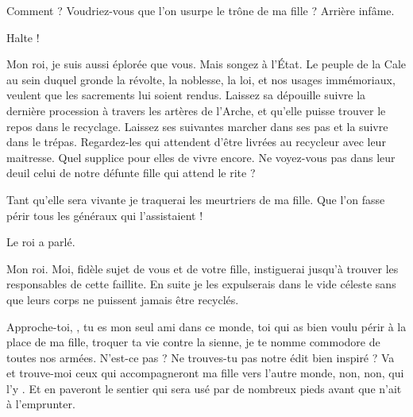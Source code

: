\begin{drama}
  \roispeaks Comment ? Voudriez-vous que l’on usurpe le trône de ma fille ? Arrière infâme.

  \kingsgardsspeaks {} Halte !

  \reinespeaks Mon roi, je suis aussi éplorée que vous. Mais songez à l’État. Le peuple de la Cale au sein duquel gronde la révolte, la noblesse, la loi, et nos usages immémoriaux, veulent que les sacrements lui soient rendus. Laissez sa dépouille suivre la dernière procession à travers les artères de l’Arche, et qu’elle puisse trouver le repos dans le recyclage. Laissez ses suivantes marcher dans ses pas et la suivre dans le trépas.
  Regardez-les qui attendent d’être livrées au recycleur avec leur maitresse. Quel supplice pour elles de vivre encore. Ne voyez-vous pas dans leur deuil celui de notre défunte fille qui attend le rite ?

  \roispeaks Tant qu’elle sera vivante je traquerai les meurtriers de ma fille. Que l’on fasse périr tous les généraux qui l’assistaient !

  \kingsgardsspeaks Le roi a parlé.

  \generalspeaks Mon roi. Moi, fidèle sujet de vous et de votre fille, instiguerai jusqu’à trouver les responsables de cette faillite. En suite je les expulserais dans le vide céleste sans que leurs corps ne puissent jamais être recyclés.

  \roispeaks Approche-toi, \general, tu es mon seul ami dans ce monde,  toi qui as bien voulu périr à la place de ma fille, troquer ta vie contre la sienne, je te nomme commodore de toutes nos armées.   N’est-ce pas \princesse ? Ne trouves-tu pas notre édit bien inspiré ?  Va et trouve-moi ceux qui accompagneront ma fille vers l’autre monde, non, non, qui l’y . Et en paveront le sentier qui sera usé par de nombreux pieds avant que \princesse n’ait à l’emprunter.

\end{drama}

\scene


\StageDirII{\elena, \alexas}



